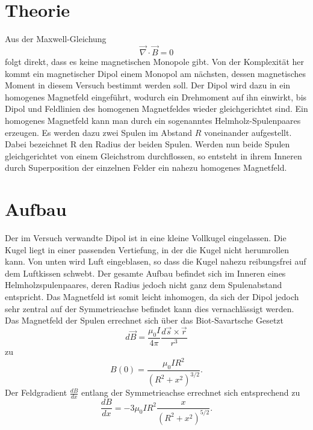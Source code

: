 \newpage					%




\section{Theorie}
Aus der Maxwell-Gleichung
\begin{equation}
\vec{\nabla} \cdot \vec{B} = 0
\end{equation}
 folgt direkt, dass es keine magnetischen Monopole gibt. Von der Komplexität her kommt  ein magnetischer Dipol einem Monopol am nächsten, dessen magnetisches Moment in diesem Versuch bestimmt werden soll.
 Der Dipol wird dazu in ein homogenes Magnetfeld eingeführt, wodurch ein Drehmoment auf ihn einwirkt, bis Dipol und Feldlinien des homogenen Magnetfeldes wieder gleichgerichtet sind.
 Ein homogenes Magnetfeld kann man durch ein sogenanntes Helmholz-Spulenpaares erzeugen. Es werden dazu zwei Spulen im Abstand $R$ voneinander aufgestellt. Dabei bezeichnet R den Radius der beiden Spulen. Werden nun beide Spulen gleichgerichtet von einem Gleichstrom durchflossen, so entsteht in ihrem Inneren durch Superposition der einzelnen Felder ein nahezu homogenes Magnetfeld.
  
\section{Aufbau}
Der im Versuch verwandte Dipol ist in eine kleine Vollkugel eingelassen. Die Kugel liegt in einer passenden Vertiefung, in der die Kugel nicht herumrollen kann. Von unten wird Luft eingeblasen, so dass die Kugel nahezu reibungsfrei auf dem Luftkissen schwebt.
Der gesamte Aufbau befindet sich im Inneren eines Helmholzspulenpaares, deren Radius jedoch nicht ganz dem Spulenabstand entspricht. Das Magnetfeld ist somit leicht inhomogen, da sich der Dipol jedoch sehr zentral auf der Symmetrieachse befindet kann dies vernachlässigt werden.
Das Magnetfeld der Spulen errechnet sich über das Biot-Savartsche Gesetzt
\begin{equation}
d \vec{B} = \frac{\mu_0 I}{4\pi} \frac{d \vec{s} \times \vec{r}}{r^3}
\end{equation} 
zu
\begin{equation}
B(0)=\frac{\mu_0 IR^2}{(R^2+x^2)^{3/2}}.
\end{equation}
Der Feldgradient $\frac{dB}{dx}$ entlang der Symmetrieachse errechnet sich entsprechend zu
\begin{equation}
\frac{dB}{dx} = -3\mu_0 IR^2 \frac{x}{(R^2+x^2)^{5/2}}.
\end{equation}
